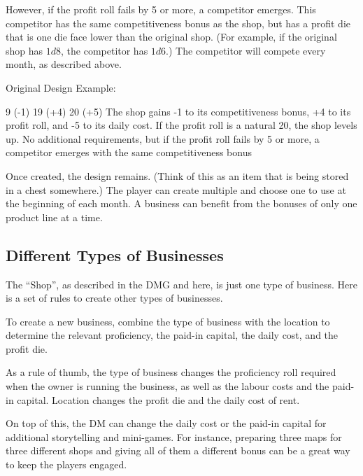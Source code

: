 \documentclass[twocolumn]{dndbook}
\begin{document}
However, if the profit roll fails by 5 or more, a competitor emerges.
	This competitor has the same competitiveness bonus as the shop,
	but has a profit die that is one die face lower than the original shop.
	(For example, if the original shop has $1d8$, the competitor has $1d6$.)
	The competitor will compete every month, as described above.

Original Design Example:
\begin{DndComment}[color=bgtan2018]{}
	\hfill 9 (-1)
	\hfill 19 (+4)
	\hfill 20 (+5)
	The shop gains -1 to its competitiveness bonus, +4 to its profit roll, and -5 to its daily cost.
	If the profit roll is a natural 20, the shop levels up.
	No additional requirements, but if the profit roll fails by 5 or more, a competitor emerges with the same competitiveness bonus
\end{DndComment}

Once created, the design remains. (Think of this as an item that is being stored in a chest somewhere.)
The player can create multiple and choose one to use at the beginning of each month.
A business can benefit from the bonuses of only one product line at a time.

\subsection{Different Types of Businesses}

The ``Shop'', as described in the DMG and here, is just one type of business.
Here is a set of rules to create other types of businesses.

\begin{emphasisParagraph}
	To create a new business, combine the type of business with the location to determine
	the relevant proficiency, the paid-in capital, the daily cost,
	and the profit die.
\end{emphasisParagraph}

As a rule of thumb, the type of business changes the proficiency roll required when the owner is running the business,
as well as the labour costs and the paid-in capital.
Location changes the profit die and the daily cost of rent.\par

On top of this, the DM can change the daily cost or the paid-in capital for additional storytelling and mini-games.
For instance, preparing three maps for three different shops and
giving all of them a different bonus can be a great way to keep the
players engaged.\par
\end{document}

